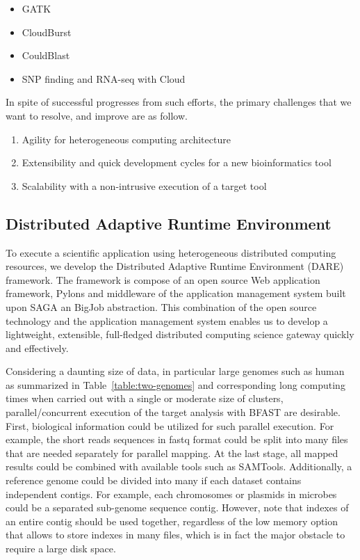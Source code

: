 \documentclass[12pt]{article}
\begin{document}
\begin{itemize}
\item GATK\cite{gatk}
\item CloudBurst\cite{cloudburst}
\item CouldBlast\cite{cloudblast}
\item SNP finding and RNA-seq with Cloud\cite{langmead2009, langmead2010}
\end{itemize}

In spite of successful progresses from such efforts, the primary challenges that we want to resolve, and improve are as follow.

\begin{enumerate}
\item Agility for heterogeneous computing architecture
\item Extensibility and quick development cycles for a new bioinformatics tool
\item Scalability with a non-intrusive execution of a target tool  
\end{enumerate}

\subsection{Distributed Adaptive Runtime Environment}

To execute a scientific application using heterogeneous distributed computing resources, we develop the Distributed Adaptive Runtime Environment (DARE) framework\cite{dareurl}.  The framework is compose of an open source Web application framework, Pylons
and middleware of the application management system built upon SAGA an BigJob abstraction\cite{saga-ccgrid10,saga-royalsoc,saga-web,jha2009developing,ecmls10}.  This combination of the open source technology and the application management system enables us to develop a lightweight, extensible, full-fledged distributed computing science gateway quickly and effectively\cite{pylonsurl}. 

Considering a daunting size of data, in particular large genomes such as human as summarized in Table~\ref{table:two-genomes} and corresponding long computing times when carried out with a single or moderate size of clusters, parallel/concurrent execution of the target analysis with BFAST are desirable.  First, biological information could be utilized for such parallel execution. For example, the short reads sequences in fastq format could be split into many files that are needed separately for parallel mapping.  At the last stage, all mapped results could be combined with available tools such as SAMTools\cite{samtools}.   Additionally, a reference genome could be divided into many if each dataset contains independent contigs.  For example, each chromosomes or plasmids in microbes could be a separated sub-genome sequence contig.  However, note that indexes of an entire contig should be used together, regardless of the low memory option that allows to store indexes in many files, which is in fact the major obstacle to require a large disk space.
\end{document}
